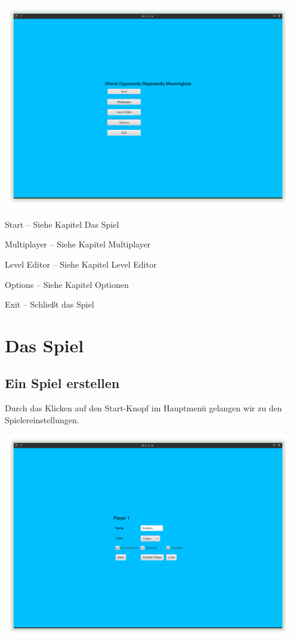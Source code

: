 \documentclass{scrreprt}
\begin{document}
\includegraphics[height=9cm]{Screenshot1.png}

Start – Siehe Kapitel Das Spiel

Multiplayer – Siehe Kapitel Multiplayer

Level Editor – Siehe Kapitel Level Editor

Options – Siehe Kapitel Optionen

Exit – Schließt das Spiel

\chapter{Das Spiel}

\section{Ein Spiel erstellen}

Durch das Klicken auf den Start-Knopf im Hauptmenü gelangen wir zu den Spielereinstellungen.

\includegraphics[height=9cm]{Screenshot5.png}
\end{document}
